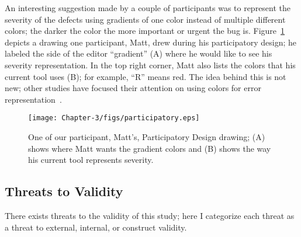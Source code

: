 An interesting suggestion made by a couple of participants was to represent
the severity of the defects using gradients of one color instead of multiple
different colors; the darker the color the more important or urgent the bug is.
Figure~\ref{fig:participatory} depicts a drawing one participant, Matt,
drew during his participatory design; he labeled the side of the editor
``gradient'' (A) where he would like to see his severity representation. In the
top right corner, Matt also lists the colors that his current tool uses (B); for
example, ``R'' means red. The idea behind this is not new; other studies have
focused their attention on using colors for error
representation~\cite{Oberg:1992:Gradients, Murphy-Hill:2010:StenchBlossom}.

\begin{figure}
\centering
\texttt{[image: Chapter-3/figs/participatory.eps]}
\caption{One of our participant, Matt's, Participatory Design drawing; (A) shows where Matt wants the gradient colors and (B) shows the way his current tool represents severity.}
\label{fig:participatory}
\end{figure}

\subsection{Threats to Validity}

There exists threats to the validity of this study;
here I categorize each threat as a threat to external,
internal, or construct validity.

